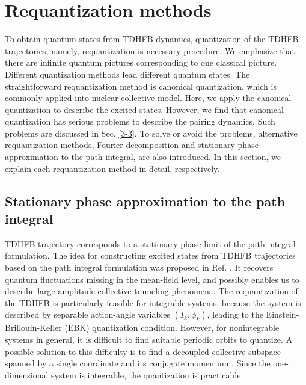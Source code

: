 \documentclass[11pt]{book} %
\begin{document}
\section{Requantization methods}
To obtain quantum states from TDHFB dynamics, quantization of the TDHFB trajectories, namely, requantization is necessary procedure. We emphasize that there are infinite quantum pictures corresponding to one classical picture. Different quantization methods lead different quantum states. The straightforward requantization method is canonical quantization, which is commonly applied into nuclear collective model. Here, we apply the canonical quantization to describe the excited states. However, we find that canonical quantization has serious problems to describe the pairing dynamics. Such problems are discussed in Sec. \ref{3-3}. To solve or avoid the problems, alternative requantization methods, Fourier decomposition and stationary-phase approximation to the path integral, are also introduced. In this section, we explain each requantization method in detail, respectively.

\subsection{Stationary phase approximation to the path integral}
TDHFB trajectory corresponds to a stationary-phase limit of the path integral formulation. The idea for constructing excited states from TDHFB trajectories based on the path integral formulation was proposed in Ref. \cite{Neg82,L80,LNP80,KS80,K81,Rei80}. 
It recovers quantum fluctuations missing in the mean-field
level, and possibly enables us to describe large-amplitude collective
tunneling phenomena.
The requantization of the TDHFB is particularly feasible
for integrable systems, because the system is described by separable
action-angle variables $(I_k, \phi_k)$, leading to
the Einstein-Brillouin-Keller (EBK) quantization condition.
However, for nonintegrable systems in general, it is difficult to find
suitable periodic orbits to quantize.
A possible solution to this difficulty is to find a decoupled collective
subspace spanned by
a single coordinate and its conjugate momentum \cite{NMMY16}.
Since the one-dimensional system is integrable, the quantization is
practicable.
\end{document}
